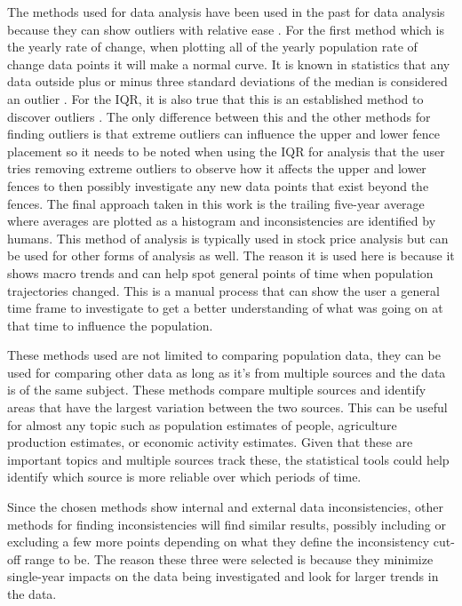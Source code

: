 \documentclass{article}
\begin{document}
The methods used for data analysis have been used in the past for data analysis because they can show outliers with relative ease \citep{oracle_outlier_nodate}. For the first method which is the yearly rate of change, when plotting all of the yearly population rate of change data points it will make a normal curve. It is known in statistics that any data outside plus or minus three standard deviations of the median is considered an outlier \citep{oracle_outlier_nodate}. For the IQR, it is also true that this is an established method to discover outliers \citep{Vinutha2018DetectionOO}. The only difference between this and the other methods for finding outliers is that extreme outliers can influence the upper and lower fence placement \citep{oracle_outlier_nodate} so it needs to be noted when using the IQR for analysis that the user tries removing extreme outliers to observe how it affects the upper and lower fences to then possibly investigate any new data points that exist beyond the fences. The final approach taken in this work is the trailing five-year average where averages are plotted as a histogram and inconsistencies are identified by humans. This method of analysis is typically used in stock price analysis \citep{law_insider_five_nodate} but can be used for other forms of analysis as well. The reason it is used here is because it shows macro trends and can help spot general points of time when population trajectories changed. This is a manual process that can show the user a general time frame to investigate to get a better understanding of what was going on at that time to influence the population. 

These methods used are not limited to comparing population data, they can be used for comparing other data as long as it's from multiple sources and the data is of the same subject. These methods compare multiple sources and identify areas that have the largest variation between the two sources. This can be useful for almost any topic such as population estimates of people, agriculture production estimates, or economic activity estimates. Given that these are important topics and multiple sources track these, the statistical tools could help identify which source is more reliable over which periods of time.

Since the chosen methods show internal and external data inconsistencies, other methods for finding inconsistencies will find similar results, possibly including or excluding a few more points depending on what they define the inconsistency cut-off range to be. The reason these three were selected is because they minimize single-year impacts on the data being investigated and look for larger trends in the data.
\end{document}
